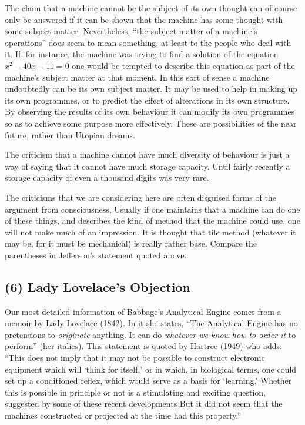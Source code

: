 \documentclass[10pt,twoside,openright]{memoir}
\begin{document}
The claim that a machine cannot be the subject of its own thought can of course only be answered if it can be shown that the machine has some thought with some subject matter. Nevertheless, ``the subject matter of a machine's operations'' does seem to mean something, at least to the people who deal with it. If, for instance, the machine was trying to find a solution of the equation $x^2 - 40x - 11 = 0$ one would be tempted to describe this equation as part of the machine's subject matter at that moment. In this sort of sense a machine undoubtedly can be its own subject matter. It may be used to help in making up its own programmes, or to predict the effect of alterations in its own structure. By observing the results of its own behaviour it can modify its own programmes so as to achieve some purpose more effectively. These are possibilities of the near future, rather than Utopian dreams.

The criticism that a machine cannot have much diversity of behaviour is just a way of saying that it cannot have much storage capacity. Until fairly recently a storage capacity of even a thousand digits was very rare.

The criticisms that we are considering here are often disguised forms of the argument from consciousness, Usually if one maintains that a machine can do one of these things, and describes the kind of method that the machine could use, one will not make much of an impression. It is thought that tile method (whatever it may be, for it must be mechanical) is really rather base. Compare the parentheses in Jefferson's statement quoted above.

\subsection{(6) Lady Lovelace's Objection}

Our most detailed information of Babbage's Analytical Engine comes from a memoir by Lady Lovelace (1842). In it she states, ``The Analytical Engine has no pretensions to \emph{originate} anything. It can do \emph{whatever we know how to order it} to perform'' (her italics). This statement is quoted by Hartree (1949) who adds: ``This does not imply that it may not be possible to construct electronic equipment which will `think for itself,' or in which, in biological terms, one could set up a conditioned reflex, which would serve as a basis for `learning.' Whether this is possible in principle or not is a stimulating and exciting question, suggested by some of these recent developments But it did not seem that the machines constructed or projected at the time had this property.''
\end{document}
